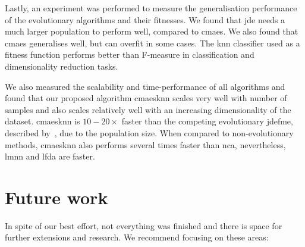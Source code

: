 \documentclass[12pt,a4paper]{report}
\begin{document}
Lastly, an experiment was performed to measure the generalisation performance of the evolutionary algorithms and their fitnesses. We found that \ac{jde} needs a much larger population to perform well, compared to \ac{cmaes}. We also found that \ac{cmaes} generalises well, but can overfit in some cases. The \ac{knn} classifier used as a fitness function performs better than F-measure in classification and dimensionality reduction tasks.

We also measured the scalability and time-performance of all algorithms and found that our proposed algorithm \ac{cmaesknn} scales very well with number of samples and also scales relatively well with an increasing dimensionality of the dataset. \ac{cmaesknn} is $10-20\times$ faster than the competing evolutionary \ac{jdefme}, described by~\citep{fukui2013evolutionary}, due to the population size. When compared to non-evolutionary methods, \ac{cmaesknn} also performs several times faster than \ac{nca}, nevertheless, \ac{lmnn} and \ac{lfda} are faster.


\chapter{Future work} \label{chap:future-work}


In spite of our best effort, not everything was finished and there is space for further extensions and research. We recommend focusing on these areas:
\end{document}
